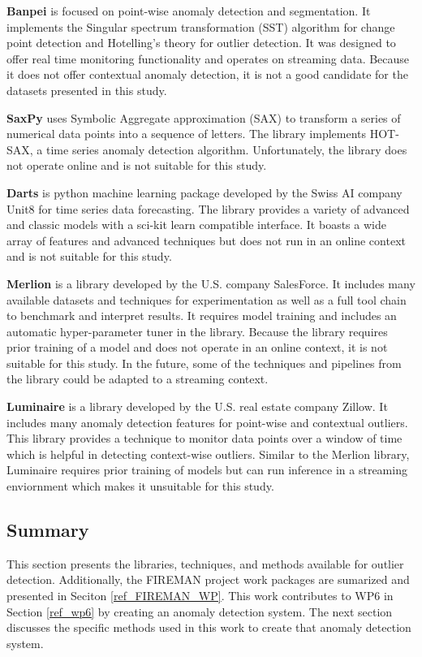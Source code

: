 \textbf{Banpei} \parencite{banpei} is focused on point-wise anomaly detection and segmentation.
It implements the Singular spectrum transformation (SST) algorithm for change point detection and Hotelling's theory for outlier detection. It was designed to offer real time monitoring functionality and operates on streaming data. Because it does not offer contextual anomaly detection, it is not a good candidate for the datasets presented in this study.

\textbf{SaxPy} \parencite{senin2018grammarviz-saxpy} uses Symbolic Aggregate approximation (SAX) to transform a series of numerical data points into a sequence of letters. The library implements HOT-SAX, a time series anomaly detection algorithm. Unfortunately, the library does not operate online and is not suitable for this study.


\textbf{Darts} \parencite{herzen2021darts} is python machine learning package developed by the Swiss AI company Unit8 for time series data forecasting. The library provides a variety of advanced and classic models with a sci-kit learn compatible interface. It boasts a wide array of features and advanced techniques but does not run in an online context and is not suitable for this study.

\textbf{Merlion} \parencite{bhatnagar2021merlion} is a library developed by the U.S. company SalesForce. It includes many available datasets and techniques for experimentation as well as a full tool chain to benchmark and interpret results. It requires model training and includes an automatic hyper-parameter tuner in the library. Because the library requires prior training of a model and does not operate in an online context, it is not suitable for this study. In the future, some of the techniques and pipelines from the library could be adapted to a streaming context.

\textbf{Luminaire} \parencite{chakraborty2020building-luminaire} is a library developed by the U.S. real estate company Zillow. It includes many anomaly detection features for point-wise and contextual outliers. This library provides a technique to monitor data points over a window of time which is helpful in detecting context-wise outliers. Similar to the Merlion library, Luminaire requires prior training of models but can run inference in a streaming enviornment which makes it unsuitable for this study.

\subsection{Summary}
This section presents the libraries, techniques, and methods available for outlier detection.
Additionally, the FIREMAN project work packages are sumarized and presented in Seciton \ref{ref_FIREMAN_WP}.
This work contributes to WP6 in Section \ref{ref_wp6} by creating an anomaly detection system.
The next section discusses the specific methods used in this work to create that anomaly detection system.


